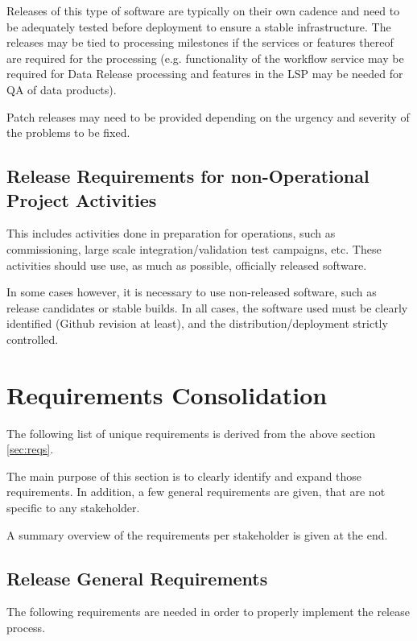 Releases of this type of software are typically on their own cadence and need to be adequately tested before deployment to ensure a stable infrastructure. 
The releases may be tied to processing milestones if the services or features thereof are required for the processing (e.g. functionality of the workflow service may be required for \gls{Data Release} processing and features in the \gls{LSP} may be needed for \gls{QA} of data products).

Patch releases may need to be provided depending on the urgency and severity of the problems to be fixed.


\subsection{Release Requirements for non-Operational Project Activities} \label{sec:nonopsreqs}

This includes activities done in preparation for operations, such as commissioning, 
large scale integration/validation test campaigns, etc. These activities should use use,  as much as possible,  officially released software.

In some cases however, it is necessary to use non-released software, such as release candidates or stable builds.
In all cases, the software used must be clearly identified (Github revision at least), and the distribution/deployment strictly controlled.


\newpage
\section{Requirements Consolidation} \label{sec:reqdef}

The following list of unique requirements is derived from the above section \ref{sec:reqs}.

The main purpose of this section is to clearly identify and expand those requirements.
In addition, a few general requirements are given, that are not specific to any stakeholder.

A summary overview of the requirements per stakeholder is given at the end.


\subsection{Release General Requirements} \label{sec:genreq}

The following requirements are needed in order to properly implement the release process.


